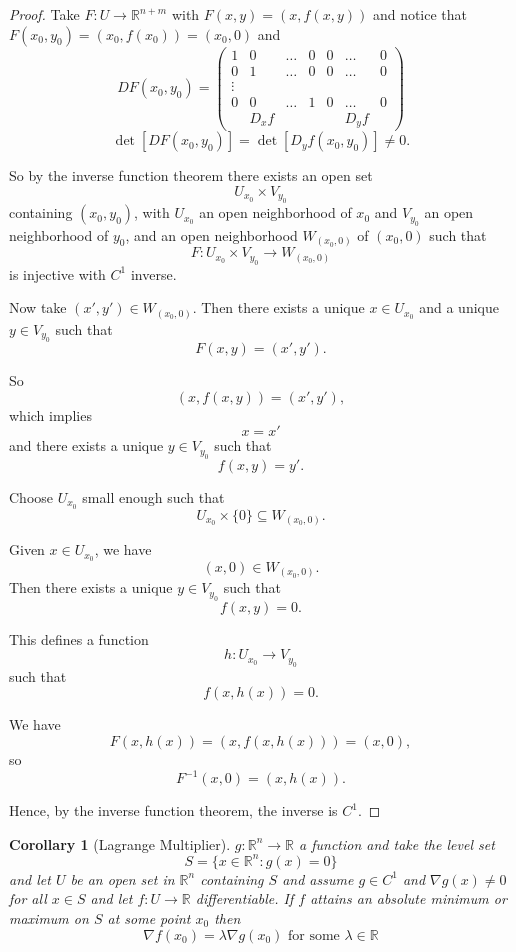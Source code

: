 \documentclass[11pt,openany]{book}
\theoremstyle{plain}
\newtheorem{corollary}{Corollary}[chapter]
\theoremstyle{definition}
\theoremstyle{remark}
\newcommand{\R}{\mathbb{R}}
\begin{document}
\begin{proof}
    Take $F: U \to \R^{n+m}$ with $F(x,y) = (x,f(x,y))$ and notice that $F(x_0,y_0) = (x_0,f(x_0)) = (x_0,0)$ and \[
DF(x_0,y_0) =
\begin{pmatrix}
1 & 0 & \dots & 0 & 0 & \dots & 0 \\[2pt]
0 & 1 & \dots & 0 & 0 & \dots & 0 \\[2pt]
\vdots \\[2pt]
0 & 0 & \dots & 1 & 0 & \dots & 0 \\[6pt]
&  D_x f & & & &  D_y f &
\end{pmatrix}
\]
\[
\det[DF(x_0,y_0)] = \det[D_y f(x_0,y_0)] \neq 0 .
\]

So by the inverse function theorem there exists an open set
\[
U_{x_0} \times V_{y_0}
\]
containing $(x_0,y_0)$, with $U_{x_0}$ an open neighborhood of $x_0$ and $V_{y_0}$ an open neighborhood of $y_0$, and an open neighborhood $W_{(x_0,0)}$ of $(x_0,0)$ such that
\[
F : U_{x_0} \times V_{y_0} \to W_{(x_0,0)}
\]
is injective with $C^1$ inverse.

Now take $(x',y') \in W_{(x_0,0)}$. Then there exists a unique $x \in U_{x_0}$ and a unique $y \in V_{y_0}$ such that
\[
F(x,y) = (x',y').
\]

So
\[
(x,f(x,y)) = (x',y'),
\]
which implies
\[
x = x'
\]
and there exists a unique $y \in V_{y_0}$ such that
\[
f(x,y) = y'.
\]

Choose $U_{x_0}$ small enough such that
\[
U_{x_0} \times \{0\} \subseteq W_{(x_0,0)}.
\]

Given $x \in U_{x_0}$, we have
\[
(x,0) \in W_{(x_0,0)}.
\]
Then there exists a unique $y \in V_{y_0}$ such that
\[
f(x,y) = 0.
\]

This defines a function
\[
h : U_{x_0} \to V_{y_0}
\]
such that
\[
f(x,h(x)) = 0.
\]

We have
\[
F(x,h(x)) = (x,f(x,h(x))) = (x,0),
\]
so
\[
F^{-1}(x,0) = (x,h(x)).
\]

Hence, by the inverse function theorem, the inverse is $C^1$.
\end{proof}

\begin{corollary}[Lagrange Multiplier]
    $g: \R^n \to \R$ a function and take the level set \[S = \{x \in \R^n: g(x)  = 0\}\] and let $U$ be an open set in $\R^n$ containing $S$ and assume $g \in C^1$ and $\nabla g(x) \ne 0$ for all $x \in S$ and let $f:U \to \R$ differentiable. If $f$ attains an absolute minimum or maximum on $S$ at some point $x_0$ then \[\nabla f(x_0) = \lambda \nabla g(x_0) \text{ for some } \lambda \in \R\]
\end{corollary}
\end{document}
